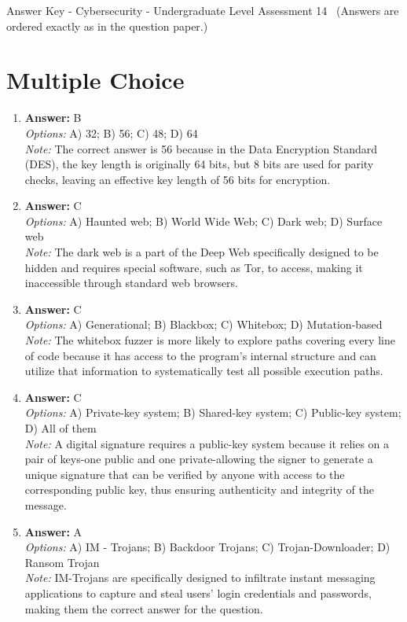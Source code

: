 \documentclass[12pt]{article}
\begin{document}
\begin{center}
Answer Key - Cybersecurity - Undergraduate Level Assessment 14 \
\small (Answers are ordered exactly as in the question paper.)
\end{center}

\section*{Multiple Choice}
\begin{enumerate}[label=\arabic*.]
\item \textbf{Answer:} B
\\ \textit{Options:} A) 32; B) 56; C) 48; D) 64
\\ \textit{Note:} The correct answer is 56 because in the Data Encryption Standard (DES), the key length is originally 64 bits, but 8 bits are used for parity checks, leaving an effective key length of 56 bits for encryption.
\item \textbf{Answer:} C
\\ \textit{Options:} A) Haunted web; B) World Wide Web; C) Dark web; D) Surface web
\\ \textit{Note:} The dark web is a part of the Deep Web specifically designed to be hidden and requires special software, such as Tor, to access, making it inaccessible through standard web browsers.
\item \textbf{Answer:} C
\\ \textit{Options:} A) Generational; B) Blackbox; C) Whitebox; D) Mutation-based
\\ \textit{Note:} The whitebox fuzzer is more likely to explore paths covering every line of code because it has access to the program's internal structure and can utilize that information to systematically test all possible execution paths.
\item \textbf{Answer:} C
\\ \textit{Options:} A) Private-key system; B) Shared-key system; C) Public-key system; D) All of them
\\ \textit{Note:} A digital signature requires a public-key system because it relies on a pair of keys-one public and one private-allowing the signer to generate a unique signature that can be verified by anyone with access to the corresponding public key, thus ensuring authenticity and integrity of the message.
\item \textbf{Answer:} A
\\ \textit{Options:} A) IM - Trojans; B) Backdoor Trojans; C) Trojan-Downloader; D) Ransom Trojan
\\ \textit{Note:} IM-Trojans are specifically designed to infiltrate instant messaging applications to capture and steal users' login credentials and passwords, making them the correct answer for the question.
\end{enumerate}
\end{document}
